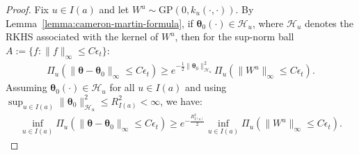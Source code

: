 \documentclass[final,12pt]{colt2026} %
\begin{document}
\begin{proof}
Fix $u\in I(a)$ and let $W^{u}\sim \mathrm{GP}(0, k_u(\cdot, \cdot))$. By Lemma~\ref{lemma:cameron-martin-formula}, if $\pmb\theta_0(\cdot) \in \mathcal{H}_u$, where $\mathcal{H}_u$ denotes the RKHS associated with the kernel of $W^{u}$, then for the sup-norm ball $A:= \{f: \lVert f \rVert_{\infty} \leq C\epsilon_t\}$:
\begin{align*}
\Pi_u\left(\lVert \pmb\theta-\pmb\theta_0\rVert_{\infty}\leq C\epsilon_t\right) \geq e^{-\frac{1}{2}\lVert\pmb\theta_0\rVert^{2}_{\mathcal{H}_u}}\Pi_u\left(\lVert W^{u}\rVert_{\infty}\leq C\epsilon_t\right).
\end{align*}
Assuming $\pmb\theta_0(\cdot) \in \mathcal{H}_u$ for all $u\in I(a)$ and using $\sup_{u\in I(a)}\lVert \pmb{\theta}_0\rVert_{\mathcal{H}_u}^{2} \leq R_{I(a)}^{2}< \infty$, we have:
\begin{align}
\label{eq:SE-contraction-3}
\inf_{u\in I(a)}\Pi_u\left(\lVert \pmb\theta-\pmb\theta_0\rVert_{\infty} \leq C\epsilon_t\right) \geq e^{-\frac{R^{2}_{I(a)}}{2}}\inf_{u\in I(a)}\Pi_u\left(\lVert W^{u}\rVert_{\infty} \leq C\epsilon_t\right).
\end{align}


\end{proof}
\end{document}
